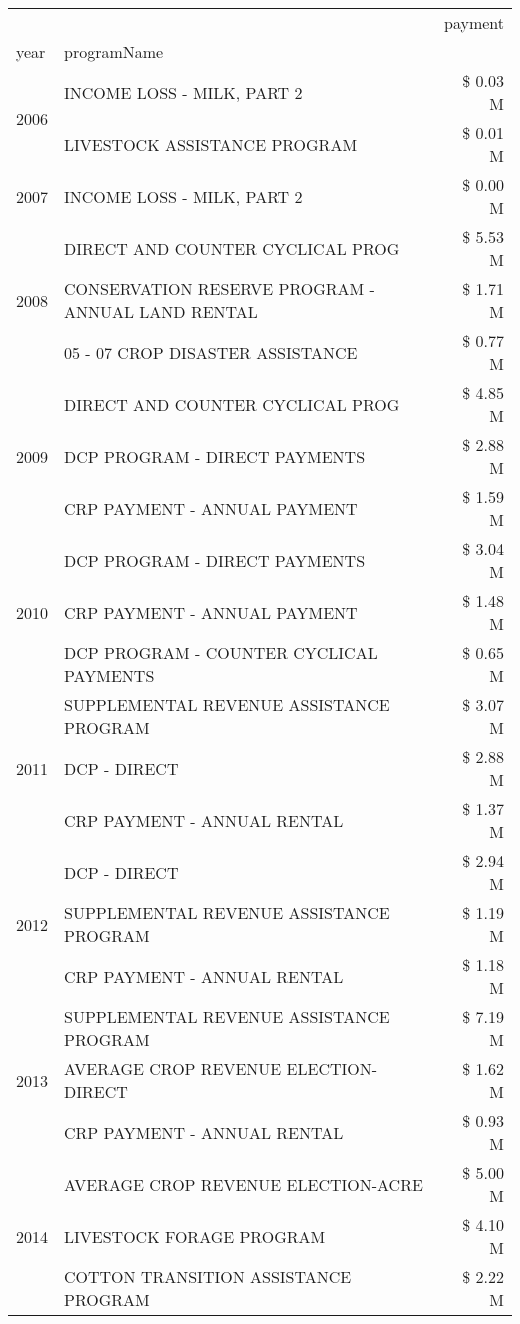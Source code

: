 \begin{tabular}{llr}
\toprule
 &  & payment \\
year & programName &  \\
\midrule
\multirow[t]{2}{*}{2006} & INCOME LOSS - MILK, PART 2 & \$ 0.03 M \\
 & LIVESTOCK ASSISTANCE PROGRAM & \$ 0.01 M \\
\cline{1-3}
2007 & INCOME LOSS - MILK, PART 2 & \$ 0.00 M \\
\cline{1-3}
\multirow[t]{3}{*}{2008} & DIRECT AND COUNTER CYCLICAL PROG & \$ 5.53 M \\
 & CONSERVATION RESERVE PROGRAM - ANNUAL LAND RENTAL & \$ 1.71 M \\
 & 05 - 07 CROP DISASTER ASSISTANCE & \$ 0.77 M \\
\cline{1-3}
\multirow[t]{3}{*}{2009} & DIRECT AND COUNTER CYCLICAL PROG & \$ 4.85 M \\
 & DCP PROGRAM - DIRECT PAYMENTS & \$ 2.88 M \\
 & CRP PAYMENT - ANNUAL PAYMENT & \$ 1.59 M \\
\cline{1-3}
\multirow[t]{3}{*}{2010} & DCP PROGRAM - DIRECT PAYMENTS & \$ 3.04 M \\
 & CRP PAYMENT - ANNUAL PAYMENT & \$ 1.48 M \\
 & DCP PROGRAM - COUNTER CYCLICAL PAYMENTS & \$ 0.65 M \\
\cline{1-3}
\multirow[t]{3}{*}{2011} & SUPPLEMENTAL REVENUE ASSISTANCE PROGRAM & \$ 3.07 M \\
 & DCP - DIRECT & \$ 2.88 M \\
 & CRP PAYMENT - ANNUAL RENTAL & \$ 1.37 M \\
\cline{1-3}
\multirow[t]{3}{*}{2012} & DCP - DIRECT & \$ 2.94 M \\
 & SUPPLEMENTAL REVENUE ASSISTANCE PROGRAM & \$ 1.19 M \\
 & CRP PAYMENT - ANNUAL RENTAL & \$ 1.18 M \\
\cline{1-3}
\multirow[t]{3}{*}{2013} & SUPPLEMENTAL REVENUE ASSISTANCE PROGRAM & \$ 7.19 M \\
 & AVERAGE CROP REVENUE ELECTION-DIRECT & \$ 1.62 M \\
 & CRP PAYMENT - ANNUAL RENTAL & \$ 0.93 M \\
\cline{1-3}
\multirow[t]{3}{*}{2014} & AVERAGE CROP REVENUE ELECTION-ACRE & \$ 5.00 M \\
 & LIVESTOCK FORAGE PROGRAM & \$ 4.10 M \\
 & COTTON TRANSITION ASSISTANCE PROGRAM & \$ 2.22 M \\

\end{tabular}

